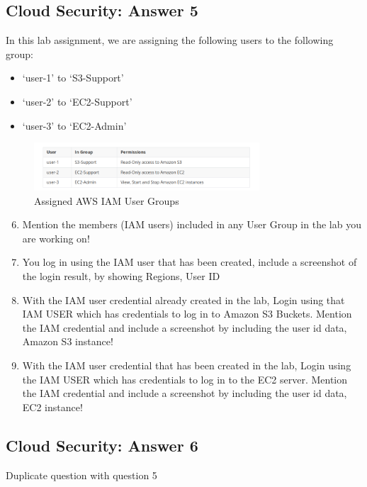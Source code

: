 \documentclass[
  11pt, %
]{assignment}
\begin{document}
\subsection*{Cloud Security: Answer 5}

In this lab assignment, we are assigning the following users to the following group:

\begin{itemize}
	\item `user-1' to `S3-Support'
	\item `user-2' to `EC2-Support'
	\item `user-3' to `EC2-Admin'
\end{itemize}

\begin{figure}[H]
	\centering
	\includegraphics[width=0.75\textwidth]{graphics/section3/IAMUserGroupAssigned.png}
	\caption{Assigned AWS IAM User Groups}\label{fig:iamusergroupassigned}
\end{figure}

\pagebreak

\begin{problem}
\begin{enumerate}
	\setcounter{enumi}{5}
	\item Mention the members (IAM users) included in any User Group in the lab you are working on!
	\item You log in using the IAM user that has been created, include a screenshot of the login result, by showing Regions, User ID
	\item With the IAM user credential already created in the lab, Login using that IAM USER which has credentials to log in to Amazon S3 Buckets. Mention the IAM credential and include a screenshot by including the user id data, Amazon S3 instance!
	\item With the IAM user credential that has been created in the lab, Login using the IAM USER which has credentials to log in to the EC2 server. Mention the IAM credential and include a screenshot by including the user id data, EC2 instance!
\end{enumerate}
\end{problem}

\subsection*{Cloud Security: Answer 6} Duplicate question with question 5
\end{document}
